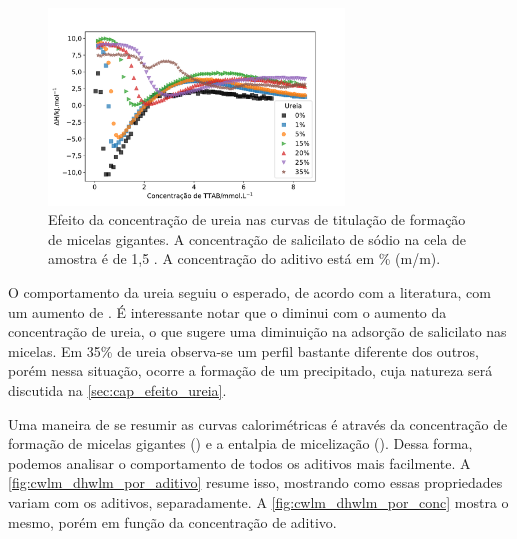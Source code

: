 			\begin{figure}[h]
				\centering
				\includegraphics[width=0.7\textwidth]{imagens/itc/ITC_MG_ur}
				\caption{Efeito da concentração de ureia nas curvas de titulação de formação de micelas gigantes. A concentração de salicilato de sódio na cela de amostra é de 1,5 \mM. A concentração do aditivo está em \% (m/m).}
				\label{fig:itc_mg_ureia}
			\end{figure} 
		
			O comportamento da ureia seguiu o esperado, de acordo com a literatura\cite{Souza2012, Bruning1961}, com um aumento de \cwlm{}. É interessante notar que o \DHwlm{} diminui com o aumento da concentração de ureia, o que sugere uma diminuição na adsorção de salicilato nas micelas. Em 35\% de ureia observa-se um perfil bastante diferente dos outros, porém nessa situação, ocorre a formação de um precipitado, cuja natureza será discutida na \autoref{sec:cap_efeito_ureia}.
			
			Uma maneira de se resumir as curvas calorimétricas é através da concentração de formação de micelas gigantes (\cwlm) e a entalpia de micelização (\DHwlm). Dessa forma, podemos analisar o comportamento de todos os aditivos mais facilmente. A \autoref{fig:cwlm_dhwlm_por_aditivo} resume isso, mostrando como essas propriedades variam com os aditivos, separadamente. A \autoref{fig:cwlm_dhwlm_por_conc} mostra o mesmo, porém em função da concentração de aditivo.
			
